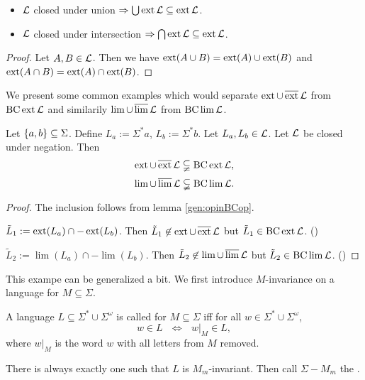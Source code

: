 \begin{lemma}
\begin{itemize}
\item
$\mathcal{L}$ closed under union $\Rightarrow \bigcup \operatorname{ext} \mathcal{L} \subseteq \operatorname{ext} \mathcal{L}$.
\item
$\mathcal{L}$ closed under intersection $\Rightarrow \bigcap \operatorname{ext} \mathcal{L} \subseteq \operatorname{ext} \mathcal{L}$.
\end{itemize}
\begin{proof}
Let $A,B \in \mathcal{L}$. Then we have $\operatorname{ext}(A\cup B) = \operatorname{ext}(A) \cup \operatorname{ext}(B)$ and $\operatorname{ext}(A\cap B) = \operatorname{ext}(A) \cap \operatorname{ext}(B)$.
\end{proof}
\end{lemma}

We present some common examples which would separate $\operatorname{ext}\cup\operatorname{\overline{ext}} \mathcal{L}$ from $\operatorname{BC} \operatorname{ext} \mathcal{L}$ and similarily $\lim\cup\operatorname{\overline{lim}} \mathcal{L}$ from $\operatorname{BC} \lim \mathcal{L}$.

\begin{example}
Let $\Set{a,b} \subseteq \Sigma$. Define $L_a := \Sigma^*a$, $L_b := \Sigma^*b$. Let $L_a,L_b \in \mathcal{L}$. Let $\mathcal{L}$ be closed under negation. Then
\[ \operatorname{ext} \cup \operatorname{\overline{ext}} \mathcal{L} \subsetneqq \operatorname{BC} \operatorname{ext} \mathcal{L} , \]
\[ \lim \cup \operatorname{\overline{lim}} \mathcal{L} \subsetneqq \operatorname{BC} \lim \mathcal{L} . \]
\begin{proof}
The inclusion follows from lemma \ref{gen:opinBCop}.

$\tilde L_1 := \operatorname{ext}(L_a) \cap -\operatorname{ext}(L_b)$. Then $\tilde L_1 \not\in \operatorname{ext} \cup \operatorname{\overline{ext}} \mathcal{L}$ but $\tilde L_1 \in \operatorname{BC} \operatorname{ext} \mathcal{L}$. ()

$\tilde L_2 := \lim(L_a) \cap -\lim(L_b)$. Then $\tilde L_2 \not\in \lim \cup \operatorname{\overline{lim}} \mathcal{L}$ but $\tilde L_2 \in \operatorname{BC} \lim \mathcal{L}$. ()
\end{proof}
\end{example}

This exampe can be generalized a bit. We first introduce $M$-invariance on a language for $M\subseteq\Sigma$.

\begin{mydef}
A language $L \subseteq \Sigma^* \cup \Sigma^\omega$ is called  for $M \subseteq\Sigma$ iff for all $w \in \Sigma^* \cup \Sigma^\omega$,
\[ w \in L \ \ \ \Leftrightarrow \ \ \  w |_M \in L , \]
where $w|_M$ is the word $w$ with all letters from $M$ removed.

There is always exactly one  such that $L$ is $M_m$-invariant. Then call $\Sigma-M_m$ the .
\end{mydef}

